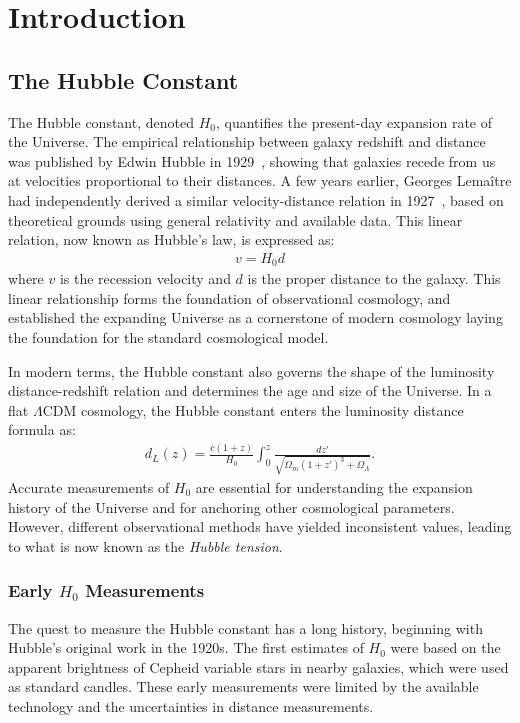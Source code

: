 \chapter{Introduction}
\label{chap:introduction}

\section{The Hubble Constant}
The Hubble constant, denoted $H_0$, quantifies the present-day expansion rate of the Universe. The empirical relationship between galaxy redshift and distance was published by Edwin Hubble in 1929~\citep{hubble1929}, showing that galaxies recede from us at velocities proportional to their distances. A few years earlier, Georges Lemaître had independently derived a similar velocity-distance relation in 1927~\citep{lemaitre1927univers}, based on theoretical grounds using general relativity and available data. This linear relation, now known as Hubble's law, is expressed as:
\begin{align}
    v = H_0 d
\end{align}
where $v$ is the recession velocity and $d$ is the proper distance to the galaxy. This linear relationship forms the foundation of observational cosmology, and established the expanding Universe as a cornerstone of modern cosmology laying the foundation for the standard cosmological model. 


In modern terms, the Hubble constant also governs the shape of the luminosity distance-redshift relation and determines the age and size of the Universe. In a flat $\Lambda$CDM cosmology, the Hubble constant enters the luminosity distance formula as:
\begin{align}
    d_L(z) = \frac{c(1+z)}{H_0} \int_0^z \frac{dz'}{\sqrt{\Omega_m(1+z')^3 + \Omega_\Lambda}}.
\end{align}
Accurate measurements of $H_0$ are essential for understanding the expansion history of the Universe and for anchoring other cosmological parameters. However, different observational methods have yielded inconsistent values, leading to what is now known as the \textit{Hubble tension}.

\subsection{Early $H_0$ Measurements}
The quest to measure the Hubble constant has a long history, beginning with Hubble's original work in the 1920s. The first estimates of $H_0$ were based on the apparent brightness of Cepheid variable stars in nearby galaxies, which were used as standard candles. These early measurements were limited by the available technology and the uncertainties in distance measurements.


